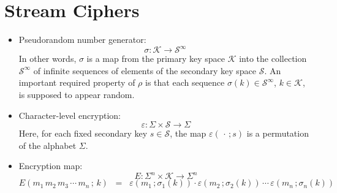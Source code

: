 
\section{Stream Ciphers}
\setcounter{theorem}{0}
\setcounter{equation}{0}

\begin{itemize}
\item
	Pseudorandom number generator:
	\begin{equation*}
	\sigma : \mathcal{K} \longrightarrow \mathcal{S}^{\infty}\,
	\end{equation*}
	In other words, $\sigma$ is a map from the primary key space $\mathcal{K}$
	into the collection $\mathcal{S}^{\infty}$ of infinite sequences of
	elements of the secondary key space $\mathcal{S}$.
	An important required property of $\rho$ is that each sequence
	$\sigma(k) \in \mathcal{S}^{\infty}$, $k \in \mathcal{K}$,
	is supposed to appear random.
\item
	Character-level encryption:
	\begin{equation*}
	\varepsilon : \Sigma \times \mathcal{S} \longrightarrow \Sigma
	\end{equation*}
	Here, for each fixed secondary key $s \in \mathcal{S}$,
	the map $\varepsilon(\,\cdot\,;s)$ is a permutation of
	the alphabet $\Sigma$.
\item
	Encryption map:
	\begin{equation*}
	E : \Sigma^{n} \times \mathcal{K} \longrightarrow \Sigma^{n}
	\end{equation*}
	\begin{equation*}
	E(m_{1}\,m_{2}\,m_{3} \,\cdots\, m_{n}\,;\,k) \;\; = \;\;
		\varepsilon(m_{1}\,;\sigma_{1}(k))
		\cdot
		\varepsilon(m_{2}\,;\sigma_{2}(k))
		\,\cdots\,
		\varepsilon(m_{n}\,;\sigma_{n}(k)) 
	\end{equation*}
\end{itemize}


